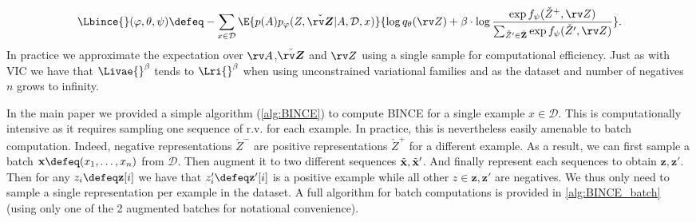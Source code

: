 \documentclass[final]{article}
\begin{document}
\begin{equation}
\Lbince{}(\varphi, \theta, \psi) \defeq
- 
\sum_{x \in \mathcal{D}}  \E{p(A) p_{\varphi}(Z, \check{\boldsymbol{\rv Z}}| A,\mathcal{D},x) }{ \log q_\theta(\rv Z) 
+ \beta \cdot \log \frac{\exp f_\psi(\check Z^{+}, \rv Z)}{\sum_{\check Z' \in \check{\mathbf{Z}}} \exp f_\psi(\check Z', \rv Z) }}.
\end{equation}
In practice we approximate the expectation over $\rv A$,$\check{\boldsymbol{\rv Z}}$ and $\rv Z$ using a single sample for computational efficiency.
Just as with VIC we have that $\Livae{}^\beta$ tends to $\Lri{}^\beta$ when using unconstrained variational families and as the dataset and number of negatives $n$ grows to infinity.

In the main paper we provided a simple algorithm (\cref{alg:BINCE}) to compute BINCE for a single example $x \in \mathcal{D}$.
This is computationally intensive as it requires sampling one sequence of r.v. for each example.
In practice, this is nevertheless easily amenable to batch computation.
Indeed, negative representations $\check Z^-$  are positive representations $\check Z^+$ for a different example.
As a result, we can first sample a batch  $\mathbf{x} \defeq (x_1, \dots, x_{n})$ from $\mathcal{D}$.
Then augment it to two different sequences $\Tilde{\mathbf x},\Tilde{\mathbf x}'$.
And finally represent each sequences to obtain $\mathbf{z},\mathbf{z}'$.
Then for any $z_i \defeq \mathbf{z}[i]$ we have that $z_i' \defeq \mathbf{z}'[i]$ is a positive example while all other $z \in \mathbf{z},\mathbf{z}'$ are negatives.
We thus only need to sample a single representation per example in the dataset.
A full algorithm for batch computations is provided in \cref{alg:BINCE_batch} (using only one of the 2 augmented batches for notational convenience).
\end{document}
